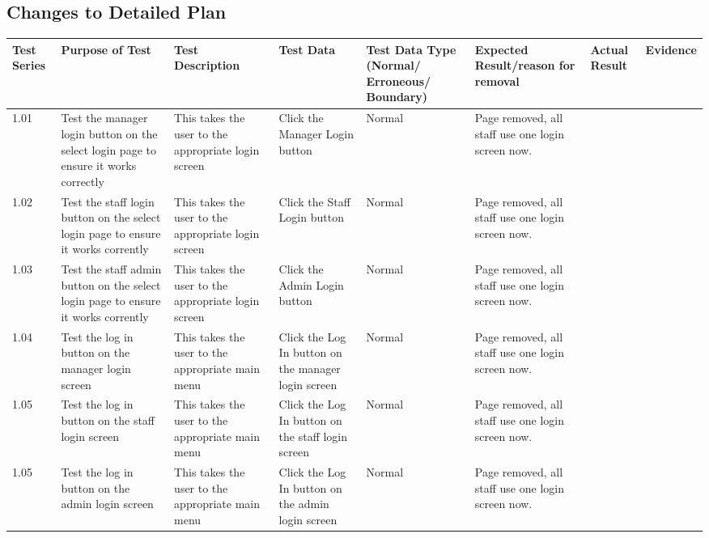 \begin{landscape}
\begin{center}
\begin{longtable}{|p{1.5cm}|p{2cm}|p{2.5cm}|p{4cm}|p{2cm}|p{2cm}|p{1cm}|p{1.7cm}|}
    \end{longtable}
\end{center}


\subsection{Changes to Detailed Plan}

\begin{center}
    \begin{longtable}{|p{1.5cm}|p{2cm}|p{2.5cm}|p{2cm}|p{2cm}|p{2cm}|p{3cm}|p{1.7cm}|}
        \hline
        \textbf{Test Series} & \textbf{Purpose of Test} & \textbf{Test Description} & \textbf{Test Data} & \textbf{Test Data Type (Normal/ Erroneous/ Boundary)} & \textbf{Expected Result/reason for removal} & \textbf{Actual Result} & \textbf{Evidence}\\ \hline
\rowcolor{gray}1.01 & Test the manager login button on the select login page to ensure it works correctly  & This takes the user to the appropriate login screen & Click the Manager Login button & Normal & Page removed, all staff use one login screen now. & & \\ \hline
\rowcolor{gray}1.02 & Test the staff login button on the select login page to ensure it works corrently & This takes the user to the appropriate login screen & Click the Staff Login button & Normal &  Page removed, all staff use one login screen now. && \\ \hline
\rowcolor{gray}1.03 & Test the staff admin button on the select login page to ensure it works corrently & This takes the user to the appropriate login screen & Click the Admin Login button & Normal &  Page removed, all staff use one login screen now. && \\ \hline
\rowcolor{gray}1.04 & Test the log in button on the manager login screen  & This takes the user to the appropriate main menu & Click the Log In button on the manager login screen & Normal &  Page removed, all staff use one login screen now.&& \\ \hline
\rowcolor{gray}1.05 & Test the log in button on the staff login screen  & This takes the user to the appropriate main menu & Click the Log In button on the staff login screen & Normal &  Page removed, all staff use one login screen now.&& \\ \hline
\rowcolor{gray}1.05 & Test the log in button on the admin login screen  & This takes the user to the appropriate main menu & Click the Log In button on the admin login screen & Normal &  Page removed, all staff use one login screen now. && \\ \hline

\end{longtable}
\end{center}
\end{landscape}
